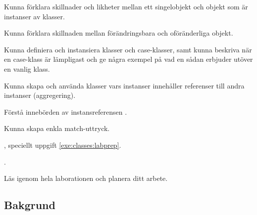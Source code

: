 

\Lab{\LabWeekSIX}

\begin{Goals}
\item Kunna förklara skillnader och likheter mellan ett singelobjekt och objekt som är instanser av klasser.
\item Kunna förklara skillnaden mellan förändringsbara och oföränderliga objekt.
\item Kunna definiera och instansiera klasser och case-klasser, samt kunna beskriva när en case-klass är lämpligast och ge några exempel på vad en sådan erbjuder utöver en vanlig klass.
\item Kunna skapa och använda klasser vars instanser innehåller referenser till andra instanser (aggregering).
\item Förstå innebörden av instansreferensen .
\item Kunna skapa enkla match-uttryck.
\end{Goals}

\begin{Preparations}
\item {}, speciellt uppgift \ref{exe:classes:labprep}.
\item {}.
\item Läs igenom hela laborationen och planera ditt arbete.
\end{Preparations}

\subsection{Bakgrund}

